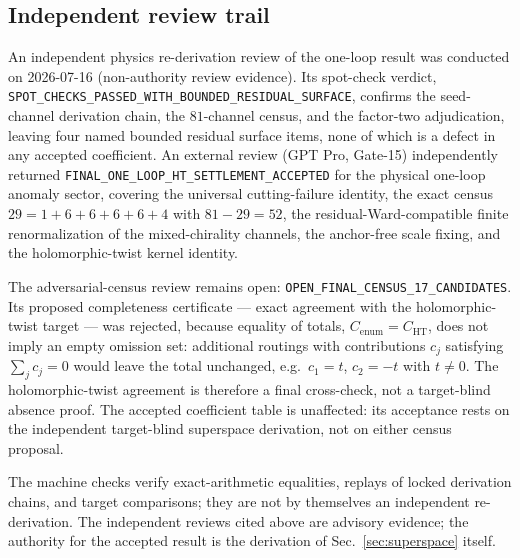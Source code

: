 \subsection*{Independent review trail}

An independent physics re-derivation review of the one-loop result was conducted on 2026-07-16 (non-authority review
evidence). Its spot-check verdict, \texttt{SPOT\_CHECKS\_PASSED\_WITH\_BOUNDED\_RESIDUAL\_SURFACE}, confirms the
seed-channel derivation chain, the $81$-channel census, and the factor-two adjudication, leaving four named bounded
residual surface items, none of which is a defect in any accepted coefficient. An external review (GPT Pro, Gate-15)
independently returned \texttt{FINAL\_ONE\_LOOP\_HT\_SETTLEMENT\_ACCEPTED} for the physical one-loop anomaly sector,
covering the universal cutting-failure identity, the exact census $29=1+6+6+6+6+4$ with $81-29=52$, the
residual-Ward-compatible finite renormalization of the mixed-chirality channels, the anchor-free scale fixing, and the
holomorphic-twist kernel identity.

\begin{remark}\label{rem:verif:caveat}
The adversarial-census review remains open: \texttt{OPEN\_FINAL\_CENSUS\_17\_CANDIDATES}. Its proposed completeness
certificate --- exact agreement with the holomorphic-twist target --- was rejected, because equality of totals,
$C_{\mathrm{enum}}=C_{\mathrm{HT}}$, does not imply an empty omission set: additional routings with contributions $c_j$
satisfying $\sum_j c_j=0$ would leave the total unchanged, e.g.\ $c_1=t$, $c_2=-t$ with $t\neq0$. The holomorphic-twist
agreement is therefore a final cross-check, not a target-blind absence proof. The accepted coefficient table is
unaffected: its acceptance rests on the independent target-blind superspace derivation, not on either census proposal.
\end{remark}

\begin{remark}\label{rem:verif:scope}
The machine checks verify exact-arithmetic equalities, replays of locked derivation chains, and target comparisons; they
are not by themselves an independent re-derivation. The independent reviews cited above are advisory evidence; the
authority for the accepted result is the derivation of Sec.~\ref{sec:superspace} itself.
\end{remark}
